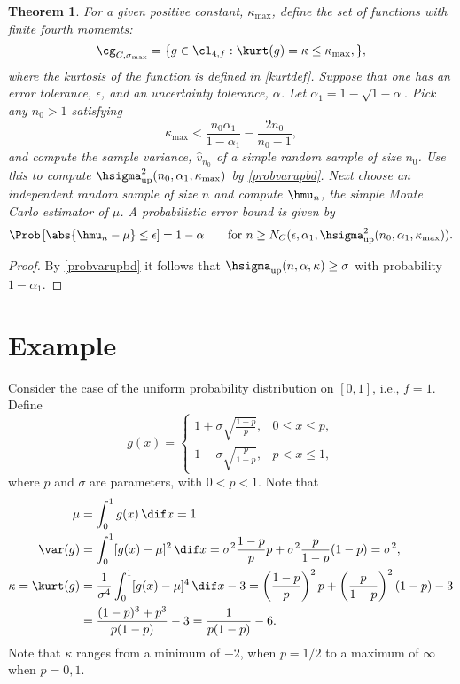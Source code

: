 \documentclass[12pt]{amsart}
\newcommand{\hv}{\hat{v}}
\newtheorem{theorem}{Theorem}
\begin{document}
\begin{theorem} For a given positive constant, $\kappa_{\max}$, define the set of functions with finite fourth momemts:
\[
\cg_{C,\sigma_{\max}}= \{g \in \cl_{4,f} : \kurt(g)= \kappa \le \kappa_{\max}, \},
\]
where the kurtosis of the function is defined in \eqref{kurtdef}.
Suppose that one has an error tolerance, $\epsilon$, and an uncertainty tolerance, $\alpha$.  Let $\alpha_1 = 1 - \sqrt{1 - \alpha}$.  Pick any $n_0>1$ satisfying 
\[
\kappa_{\max} < \frac{n_0 \alpha_1}{1-\alpha_1} - \frac{2n_0}{n_0-1},
\]
and compute the sample variance, $\hv_{n_0}$ of a simple random sample of size $n_0$.  Use this to compute $\hsigma^2_{\text{\rm up}}(n_0,\alpha_1,\kappa_{\max})$ by \eqref{probvarupbd}.
Next choose an independent random sample of size $n$ and compute $\hmu_n$, the simple Monte Carlo estimator of $\mu$.  A probabilistic error bound is given by 
\[
\Prob\left[\abs{\hmu_n-\mu} \le \epsilon \right] = 1-\alpha \qquad \text{for } n\ge N_{C}(\epsilon,\alpha_1,\hsigma^2_{\text{\rm up}}(n_0,\alpha_1,\kappa_{\max})).
\]
\end{theorem}
\begin{proof} By \eqref{probvarupbd} it follows that $\hsigma_{\text{up}}(n,\alpha,\kappa)  \ge \sigma$ with probability $1-\alpha_1$.  

\end{proof}

\section{Example}

Consider the case of the uniform probability distribution on $[0,1]$, i.e., $f=1$.  Define
\[
g(x) = \begin{cases} 1 + \sigma \sqrt{\frac{1-p}{p}}, & 0 \le x \le p,\\
1 - \sigma \sqrt{\frac{p}{1-p}}, & p < x \le 1, 
\end{cases}
\]
where $p$ and $\sigma$ are parameters, with $0 < p < 1$.
Note that
\begin{align*}
\mu &= \int_0^1 g(x) \, \dif x = 1\\
\var(g) &= \int_0^1 [g(x)-\mu]^2 \, \dif x = \sigma^2 \frac{1-p}{p} p + \sigma^2 \frac{p}{1-p} (1-p) = \sigma^2, \\
\kappa = \kurt(g) &= \frac{1}{\sigma^4}\int_0^1 [g(x)-\mu]^4 \, \dif x - 3 = \left(\frac{1-p}{p}\right)^2 p + \left(\frac{p}{1-p} \right)^2 (1-p) - 3 \\
& = \frac{(1-p)^3 + p^3}{p(1-p)} - 3 = \frac{1}{p(1-p)} - 6.
\end{align*}
Note that $\kappa$ ranges from a minimum of $-2$, when $p=1/2$ to a maximum of $\infty$ when $p=0,1$.
\end{document}
